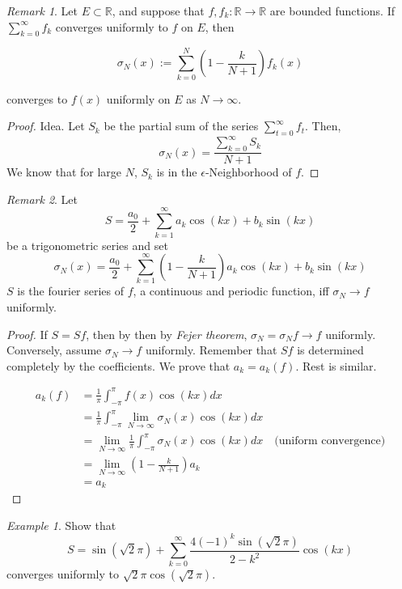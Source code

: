 \documentclass{article}
\theoremstyle{remark}
\newtheorem*{remark}{Remark}
\theoremstyle{lemma}
\theoremstyle{example}
\newtheorem*{example}{Example}
\theoremstyle{proofTrial}
\theoremstyle{definition}
\begin{document}
\begin{remark}
    Let $E \subset \mathbb{R}$, and suppose that $f, f_k : \mathbb{R} \to \mathbb{R}$ are bounded functions. If $\sum_{k = 0}^{ \infty} f_k$ converges uniformly to $f$ on $E$, then

\[\sigma_N(x) := \sum_{k=0}^{N} (1 - \frac{k}{N+1}) f_k(x)\]

converges to $f(x)$ uniformly on $E$ as $N \to \infty$.

\end{remark}
\begin{proof}{Idea.} Let $S_k$ be the partial sum of the series  $\sum_{t = 0}^{\infty}f_t$. Then,
\[
\sigma_N(x) = \frac{\sum_{k = 0}^{\infty}S_k}{N+1}
\]
We know that for large $N$, $S_k$ is in the $\epsilon$-Neighborhood of \(f\).

\end{proof}
\begin{remark}
    Let
    \[
    S = \frac{a_0}{2} +\sum_{k=1}^{\infty}a_k\cos(kx) + b_k\sin(kx)
    \]
    be a trigonometric series and set
    \[
    \sigma_N(x) = \frac{a_0}{2} +\sum_{k=1}^{\infty}(1 - \frac{k}{N+1})a_k\cos(kx) + b_k\sin(kx)
    \]
    $S$ is the fourier series of $f$, a continuous and periodic function, iff $\sigma_N \to f$ uniformly.
\end{remark}
\begin{proof}
    If $ S = Sf$, then by then by \textit{Fejer theorem}, $\sigma_N = \sigma_Nf \to f$ uniformly.
    Conversely, assume $\sigma_N \to f$ uniformly. Remember that $Sf$ is determined completely by the coefficients. We prove that $a_k = a_k(f)$. Rest is similar.

    \begin{align*}
        a_k(f) &= \frac{1}{\pi} \int_{-\pi}^{\pi} f(x) \cos(kx) dx\\
        &= \frac{1}{\pi} \int_{-\pi}^{\pi} \lim_{N \to \infty}\sigma_N(x) \cos(kx) dx\\
        &= \lim_{N \to \infty} \frac{1}{\pi} \int_{-\pi}^{\pi} \sigma_N(x) \cos(kx) dx \quad \text{(uniform convergence)}\\
        &= \lim_{N \to \infty} (1 - \frac{k}{N+1})a_k \\
        &= a_k
    \end{align*}

\end{proof}
\begin{example}
    Show that
    \[
    S = \sin(\sqrt{2}\pi) + \sum_{k=0}^{\infty}\frac{4(-1)^k\sin(\sqrt{2}\pi)}{2-k^2}\cos(kx)
    \]
    converges uniformly to $\sqrt{2}\pi\cos(\sqrt{2}\pi)$.
\end{example}
\end{document}
